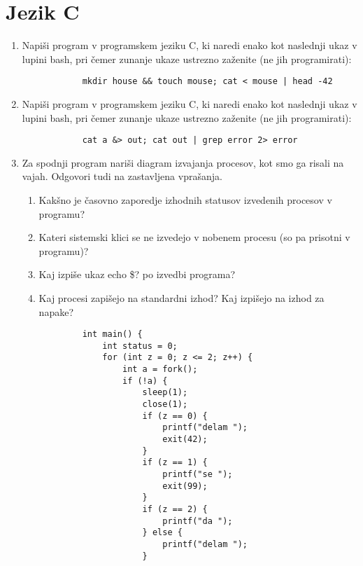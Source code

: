 \documentclass{book}
\begin{document}
\section{Jezik C}
\begin{enumerate}
    \item Napiši program v programskem jeziku C, ki naredi enako kot naslednji ukaz v lupini bash, pri čemer zunanje ukaze ustrezno zaženite (ne jih programirati): 
        \begin{verbatim}
            mkdir house && touch mouse; cat < mouse | head -42    
        \end{verbatim}
    \item Napiši program v programskem jeziku C, ki naredi enako kot naslednji ukaz v lupini bash, pri čemer zunanje ukaze ustrezno zaženite (ne jih programirati):
        \begin{verbatim}
            cat a &> out; cat out | grep error 2> error
        \end{verbatim}
    \item Za spodnji program nariši diagram izvajanja procesov, kot smo ga risali na vajah. Odgovori tudi na zastavljena vprašanja.
        \begin{enumerate}
            \item Kakšno je časovno zaporedje izhodnih statusov izvedenih procesov v programu?
            \item Kateri sistemski klici se ne izvedejo v nobenem procesu (so pa prisotni v programu)?
            \item Kaj izpiše ukaz echo \$? po izvedbi programa?
            \item Kaj procesi zapišejo na standardni izhod? Kaj izpišejo na izhod za napake?
        \end{enumerate}
        \begin{verbatim}
            int main() {
                int status = 0;
                for (int z = 0; z <= 2; z++) {
                    int a = fork();
                    if (!a) {
                        sleep(1);
                        close(1);
                        if (z == 0) {
                            printf("delam ");
                            exit(42);
                        }
                        if (z == 1) {
                            printf("se ");
                            exit(99);
                        }
                        if (z == 2) {
                            printf("da ");
                        } else {
                            printf("delam ");
                        }

\end{verbatim}
\end{enumerate}
\end{document}
